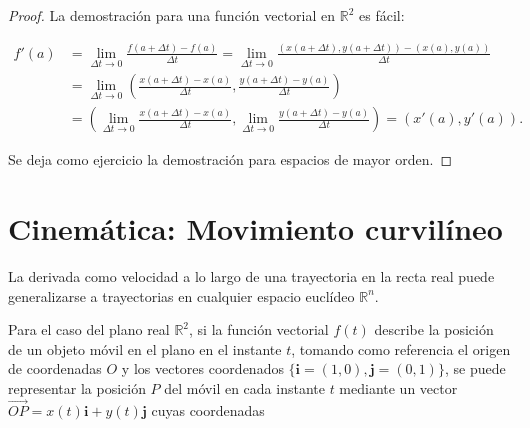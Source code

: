\documentclass[
  a4paper,
]{scrreport}
\theoremstyle{definition}
\theoremstyle{plain}
\theoremstyle{plain}
\theoremstyle{plain}
\theoremstyle{definition}
\theoremstyle{remark}
\begin{document}
\begin{tcolorbox}[enhanced jigsaw, rightrule=.15mm, colframe=quarto-callout-note-color-frame, arc=.35mm, leftrule=.75mm, colbacktitle=quarto-callout-note-color!10!white, bottomrule=.15mm, toptitle=1mm, breakable, opacitybacktitle=0.6, coltitle=black, left=2mm, colback=white, titlerule=0mm, opacityback=0, title=\textcolor{quarto-callout-note-color}{\faInfo}\hspace{0.5em}{Demostración}, toprule=.15mm, bottomtitle=1mm]

\begin{proof}

La demostración para una función vectorial en \(\mathbb{R}^2\) es fácil:

\begin{align*}
f'(a) 
&= \lim_{\Delta t\rightarrow 0} \frac{f(a+\Delta t)-f(a)}{\Delta t} 
= \lim_{\Delta t\rightarrow 0} \frac{(x(a+\Delta t),y(a+\Delta t))-(x(a),y(a))}{\Delta t} \\
&= \lim_{\Delta t\rightarrow 0} \left(\frac{x(a+\Delta t)-x(a)}{\Delta t},\frac{y(a+\Delta t)-y(a)}{\Delta t}\right) \\
&= \left(\lim_{\Delta t\rightarrow 0}\frac{x(a+\Delta t)-x(a)}{\Delta t},\lim_{\Delta t\rightarrow 0}\frac{y(a+\Delta t)-y(a)}{\Delta t}\right) 
= (x'(a),y'(a)).
\end{align*}

Se deja como ejercicio la demostración para espacios de mayor orden.

\end{proof}

\end{tcolorbox}

\hypertarget{cinemuxe1tica-movimiento-curviluxedneo}{%
\section{Cinemática: Movimiento
curvilíneo}\label{cinemuxe1tica-movimiento-curviluxedneo}}

La derivada como velocidad a lo largo de una trayectoria en la recta
real puede generalizarse a trayectorias en cualquier espacio euclídeo
\(\mathbb{R}^n\).

Para el caso del plano real \(\mathbb{R}^2\), si la función vectorial
\(f(t)\) describe la posición de un objeto móvil en el plano en el
instante \(t\), tomando como referencia el origen de coordenadas \(O\) y
los vectores coordenados \(\{\mathbf{i}=(1,0),\mathbf{j}=(0,1)\}\), se
puede representar la posición \(P\) del móvil en cada instante \(t\)
mediante un vector \(\vec{OP}=x(t)\mathbf{i}+y(t)\mathbf{j}\) cuyas
coordenadas
\end{document}
